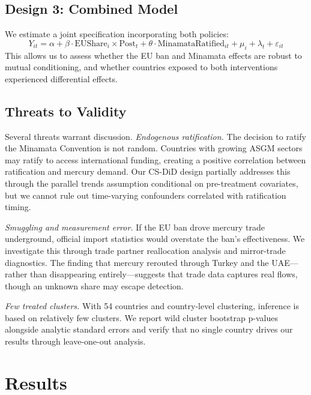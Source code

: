 \documentclass[12pt]{article}
\begin{document}
\subsection{Design 3: Combined Model}

We estimate a joint specification incorporating both policies:
\begin{equation}
\label{eq:combined}
Y_{it} = \alpha + \beta \cdot \text{EUShare}_i \times \text{Post}_t + \theta \cdot \text{MinamataRatified}_{it} + \mu_i + \lambda_t + \varepsilon_{it}
\end{equation}
This allows us to assess whether the EU ban and Minamata effects are robust to mutual conditioning, and whether countries exposed to both interventions experienced differential effects.

\subsection{Threats to Validity}

Several threats warrant discussion. \textit{Endogenous ratification.} The decision to ratify the Minamata Convention is not random. Countries with growing ASGM sectors may ratify to access international funding, creating a positive correlation between ratification and mercury demand. Our CS-DiD design partially addresses this through the parallel trends assumption conditional on pre-treatment covariates, but we cannot rule out time-varying confounders correlated with ratification timing.

\textit{Smuggling and measurement error.} If the EU ban drove mercury trade underground, official import statistics would overstate the ban's effectiveness. We investigate this through trade partner reallocation analysis and mirror-trade diagnostics. The finding that mercury rerouted through Turkey and the UAE---rather than disappearing entirely---suggests that trade data captures real flows, though an unknown share may escape detection.

\textit{Few treated clusters.} With 54 countries and country-level clustering, inference is based on relatively few clusters. We report wild cluster bootstrap p-values alongside analytic standard errors and verify that no single country drives our results through leave-one-out analysis.


\section{Results}
\end{document}
